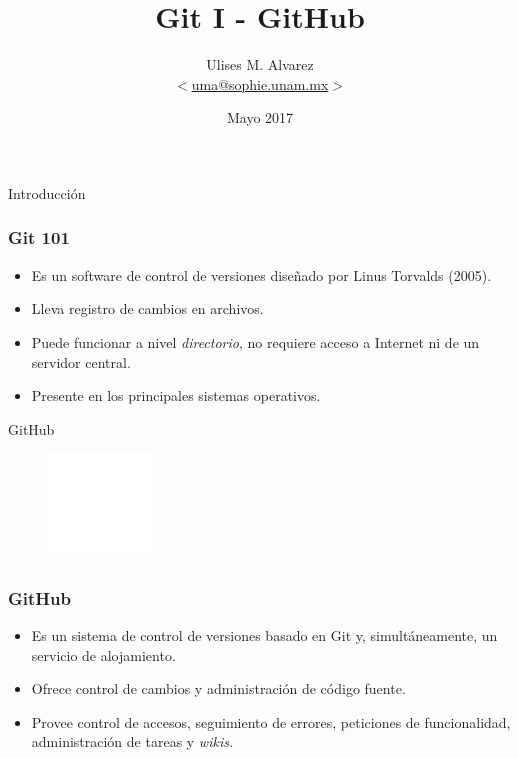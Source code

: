\documentclass{beamer}
\title{Git I - GitHub}
\date{Mayo 2017}
\author{Ulises M. Alvarez\\ %
   $<$\href{mailto:uma@sophie.unam.mx}%
   {uma@sophie.unam.mx}$>$
}
\institute{Sophie UNAM}
\begin{document}
\maketitle



\begin{frame}[standout]
  Introducción
\end{frame}

\begin{frame}
  \frametitle{Git 101}
  \begin{itemize}
  \item Es un software de control de versiones diseñado por Linus
    Torvalds (2005).
  \item Lleva registro de cambios en archivos.
  \item Puede funcionar a nivel \textit{directorio}, no requiere
    acceso a Internet ni de un servidor central.
  \item Presente en los principales sistemas operativos.
  \end{itemize}
\end{frame}

\begin{frame}[standout]
  GitHub
  \begin{figure}[b]
    \centering
    \includegraphics[width=0.25\textwidth]{fig/GitHub}
    \label{fig:githsci}
  \end{figure}
\end{frame}

\begin{frame}
  \frametitle{GitHub}
  \begin{itemize}
  \item Es un sistema de control de versiones basado en Git y,
    simult\'aneamente, un servicio de alojamiento.
  \item Ofrece control de cambios y administraci\'on de c\'odigo
    fuente.
  \item Provee control de accesos, seguimiento de errores, peticiones
    de funcionalidad, administraci\'on de tareas y \textit{wikis.}
  \end{itemize}
\end{frame}
\end{document}

